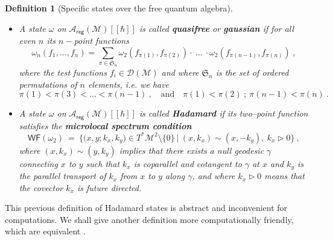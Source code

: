 \documentclass[11pt]{book}
\newcommand{\WF}{\mathsf{WF}}
\newcommand{\reg}{\mathsf{reg}}
\newcommand{\Acal}{\mathcal{A}}
\newcommand{\Dcal}{\mathcal{D}}
\newcommand{\Mcal}{\mathcal{M}}
\newcommand{\Srak}{\mathfrak{S}}
\theoremstyle{break}
\newtheorem{definition}{Definition}[chapter]
\begin{document}
\begin{definition}[Specific states over the free quantum algebra]
%
\begin{itemize}
\setlength\itemsep{0pt}
\item A state $\omega$ on $\Acal_\reg(\Mcal)[[\hbar]]$ is called \textbf{quasifree} or \textbf{gaussian} if for all even $n$ its $n-$point functions
%
\begin{equation*}
\omega_n\left(f_1,  \dots , f_n  \right) =  \sum_{\pi \in \Srak_n} \omega_2\left( f_{\pi(1)}, f_{\pi(2)} \right) \cdot \ \dots \ \cdot \omega_2\left( f_{\pi(n-1)}, f_{\pi(n)} \right) \ ,
\end{equation*}
%
where the test functions $f_i \in \Dcal(\Mcal)$ and where $\Srak_n$ is the set of ordered permutations of $n$ elements, i.e. we have 
%
\begin{equation*}
\pi(1) < \pi(3) < \dots < \pi(n-1) \ , \quad \mbox{and} \quad \pi(1) < \pi(2) \ ;  \ \pi(n-1) < \pi(n) \ . 
\end{equation*}
%
%
%
\item A state $\omega$ on $\Acal_\reg(\Mcal)[[\hbar]]$ is called \textbf{Hadamard} if its two--point function satisfies the \textbf{microlocal spectrum condition}
%
\begin{equation}
\WF(\omega_2) \ = \ \bigg\{ \bigg( x, y ; k_x, k_y \bigg) \in T^\ast\Mcal^2 \setminus \{0\} \ \bigg| \ (x,k_x) \sim (x,-k_y), \ k_x \triangleright 0 \bigg\} \ ,
\label{eq:microlocal_spectrum_condition}
\end{equation}
%
where $(x,k_x) \sim (y,k_y)$ implies that there exists a null geodesic $\gamma$ connecting $x$ to $y$ such that $k_x$ is coparallel and cotangent to $\gamma$ at $x$ and $k_y$ is the parallel transport of $k_x$ from $x$ to $y$ along $\gamma$, and where $k_x \triangleright 0$ means that the covector $k_x$ is future directed.
\end{itemize}
\end{definition}


This previous definition of Hadamard states is abstract and inconvenient for computations. We shall give another definition more computationally friendly, which are equivalent \cite{radzikowski_micro-local_1996}.
\end{document}
